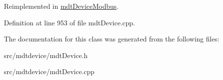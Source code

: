 Reimplemented in \hyperlink{classmdt_device_modbus_aad3ce85a19307e3056b940da99fe512b}{mdtDeviceModbus}.



Definition at line 953 of file mdtDevice.cpp.



The documentation for this class was generated from the following files:\begin{DoxyCompactItemize}
\item 
src/mdtdevice/mdtDevice.h\item 
src/mdtdevice/mdtDevice.cpp\end{DoxyCompactItemize}
